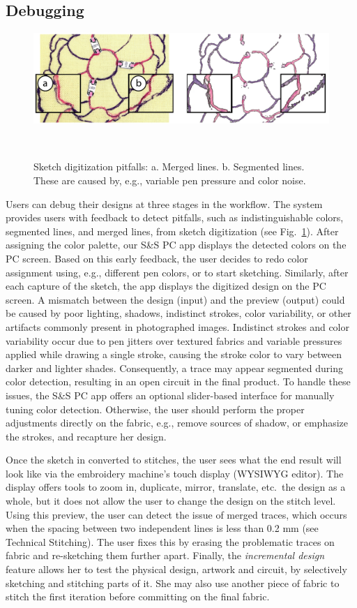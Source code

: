 \documentclass[header.tex]{subfiles}
\begin{document}
\subsection{Debugging}
\begin{figure} [t!]
\centering
  \includegraphics[width=0.9\columnwidth]{figures/Debugging.png}
  \caption{Sketch digitization pitfalls: a. Merged lines. b. Segmented lines. These are caused by, e.g., variable pen pressure and color noise.}~\label{fig:Debugging}
  \vspace{-2.2em}
\end{figure}
Users can debug their designs at three stages in the workflow. The system provides users with feedback to detect pitfalls, such as indistinguishable colors, segmented lines, and merged lines, from sketch digitization (see Fig.\ \ref{fig:Debugging}). After assigning the color palette, our S\&S PC app displays the detected colors on the PC screen. Based on this early feedback, the user decides to redo color assignment using, e.g., different pen colors, or to start sketching. Similarly, after each capture of the sketch, the app displays the digitized design on the PC screen. A mismatch between the design (input) and the preview (output) could be caused by poor lighting, shadows, indistinct strokes, color variability, or other artifacts commonly present in photographed images. Indistinct strokes and color variability occur due to pen jitters over textured fabrics and variable pressures applied while drawing a single stroke, causing the stroke color to vary between darker and lighter shades. Consequently, a trace may appear segmented during color detection, resulting in an open circuit in the final product. To handle these issues, the S\&S PC app offers an optional slider-based interface for manually tuning color detection. Otherwise, the user should perform the proper adjustments directly on the fabric, e.g., remove sources of shadow, or emphasize the strokes, and recapture her design. 

Once the sketch in converted to stitches, the user sees what the end result will look like via the embroidery machine's touch display (WYSIWYG editor). The display offers tools to zoom in, duplicate, mirror, translate, etc.\ the design as a whole, but it does not allow the user to change the design on the stitch level. Using this preview, the user can detect the issue of merged traces, which occurs when the spacing between two independent lines is less than 0.2 mm (see Technical Stitching). The user fixes this by erasing the problematic traces on fabric and re-sketching them further apart. Finally, the \textit{incremental design} feature allows her to test the physical design, artwork and circuit, by selectively sketching and stitching parts of it. She may also use another piece of fabric to stitch the first iteration before committing on the final fabric.
\end{document}

